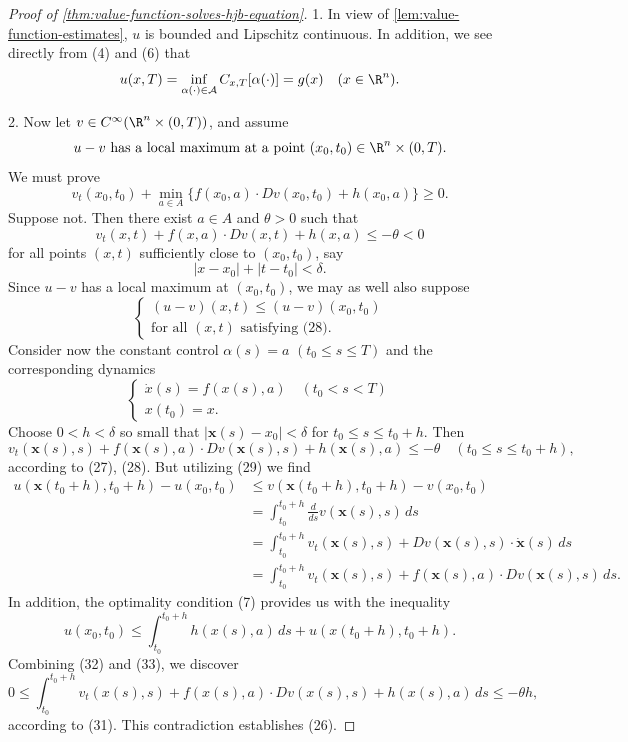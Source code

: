 \begin{proof}[Proof of \cref{thm:value-function-solves-hjb-equation}]
1. In view of \cref{lem:value-function-estimates}, $u$ is bounded and Lipschitz continuous. In addition, we see directly from (4) and (6) that
\[
u(x,T) = \inf_{\alpha(\cdot)\in \mathcal{A}} C_{x,T}[\alpha(\cdot)] = g(x) \quad (x \in \R^n).
\]

2. Now let $v \in C^\infty(\R^n \times (0,T))$, and assume
\[
u - v \text{ has a local maximum at a point } (x_0,t_0) \in \R^n \times (0,T).
\]
We must prove
\[
v_t(x_0, t_0) + \min_{a\in A}\{f(x_0, a) \cdot Dv(x_0, t_0) + h(x_0, a)\} \geq 0.
\tag{26}
\]
Suppose not. Then there exist $a \in A$ and $\theta > 0$ such that
\[
v_t(x,t) + f(x,a) \cdot Dv(x,t) + h(x,a) \leq -\theta < 0
\tag{27}
\]
for all points $(x,t)$ sufficiently close to $(x_0, t_0)$, say
\[
|x - x_0| + |t - t_0| < \delta.
\tag{28}
\]
Since $u - v$ has a local maximum at $(x_0, t_0)$, we may as well also suppose
\[
\begin{cases} (u - v)(x,t) \leq (u - v)(x_0, t_0) \\ \text{for all $(x,t)$ satisfying (28)}. \end{cases}
\tag{29}
\]
Consider now the constant control $\alpha(s) = a$ $(t_0 \leq s \leq T)$ and the corresponding dynamics
\[
\begin{cases} \dot{x}(s) = f(x(s), a) \quad (t_0 < s < T) \\ x(t_0) = x. \end{cases}
\tag{30}
\]
Choose $0 < h < \delta$ so small that $|\mathbf{x}(s) - x_0| < \delta$ for $t_0 \leq s \leq t_0 + h$. Then
\[
v_t(\mathbf{x}(s),s)+f(\mathbf{x}(s),a) \cdot Dv(\mathbf{x}(s),s)+h(\mathbf{x}(s),a) \leq -\theta \quad (t_0 \leq s \leq t_0+h),
\tag{31}
\]
according to (27), (28). But utilizing (29) we find
\[
\begin{aligned}
u(\mathbf{x}(t_0 + h), t_0 + h) - u(x_0, t_0) &\leq v(\mathbf{x}(t_0 + h), t_0 + h) - v(x_0, t_0) \\
&= \int_{t_0}^{t_0+h} \frac{d}{ds} v(\mathbf{x}(s), s)\, ds \\
&= \int_{t_0}^{t_0+h} v_t(\mathbf{x}(s), s) + Dv(\mathbf{x}(s), s) \cdot \dot{\mathbf{x}}(s)\, ds \\
&= \int_{t_0}^{t_0+h} v_t(\mathbf{x}(s), s) + f(\mathbf{x}(s), a) \cdot Dv(\mathbf{x}(s), s)\, ds.
\end{aligned}
\tag{32}
\]
In addition, the optimality condition (7) provides us with the inequality
\[
u(x_0, t_0) \le \int_{t_0}^{t_0+h} h(x(s), a) \, ds + u(x(t_0 + h), t_0 + h).
\tag{33}
\]
Combining (32) and (33), we discover
\[
0 \le \int_{t_0}^{t_0+h} v_t(x(s), s) + f(x(s), a) \cdot Dv(x(s), s) + h(x(s), a) \, ds \le -\theta h,
\]
according to (31). This contradiction establishes (26).


\end{proof}
